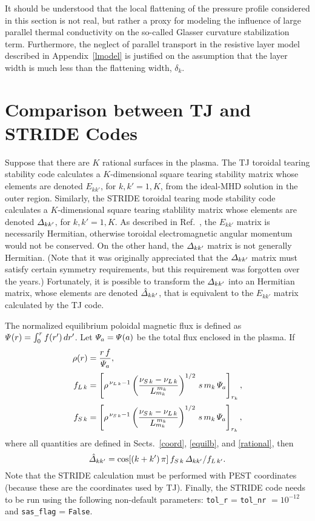 \documentclass[12pt,prb,aps]{revtex4-1}
\begin{document}
It should be understood that the local flattening of the pressure profile considered in this section is not real, but rather a proxy for modeling the influence of large parallel thermal conductivity on the so-called 
Glasser curvature stabilization term.\cite{ggj,ggj1,con1} Furthermore,  the neglect of parallel transport in the resistive layer model
described in Appendix~\ref{lmodel} is justified on the assumption that the layer width is much less than the flattening width, $\delta_{k}$. 

\section{Comparison between TJ and STRIDE Codes}\label{comp}
Suppose that there are $K$ rational surfaces in the plasma. 
The TJ toroidal tearing stability code calculates a $K$-dimensional square tearing stability matrix whose elements are denoted $E_{kk'}$, for $k,k'=1,K$, from the
ideal-MHD solution in the outer region.\cite{tj} Similarly, the STRIDE toroidal tearing mode stability code calculates a $K$-dimensional square tearing stablility
matrix whose elements are denoted ${\mit\Delta}_{kk'}$, for $k,k'=1,K$.\cite{aglas1} As described in Ref.~, the $E_{kk'}$ matrix is necessarily Hermitian,
otherwise toroidal electromagnetic angular momentum would not be conserved. On the other hand, the ${\mit\Delta}_{kk'}$ matrix is not generally Hermitian. 
(Note that it was originally appreciated that the ${\mit\Delta}_{kk'}$ matrix must satisfy certain symmetry requirements,\cite{pletz1} but this requirement
was forgotten over the years.) Fortunately, it is possible to transform the ${\mit\Delta}_{kk'}$ into an Hermitian matrix, whose elements are denoted $\hat{\mit\Delta}_{kk'}$, 
that is equivalent to the $E_{kk'}$ matrix calculated by the TJ code. 

The normalized  equilibrium poloidal magnetic flux is defined as ${\mit\Psi}(r)= \int_0^r f(r')\,dr'$. Let ${\mit\Psi}_a={\mit\Psi}(a)$ be the total flux enclosed in the plasma. 
If
\begin{align}
\rho(r) &= \frac{r\,f}{{\mit\Psi}_a},\\[0.5ex]
f_{L\,k}& = \left[\rho^{\,\nu_{L\,k}-1}\left(\frac{\nu_{S\,k}-\nu_{L\,k}}{L_{m_k}^{\,m_k}}\right)^{1/2}\,s\,m_k\,{\mit\Psi}_a\right]_{r_k},\\[0.5ex]
f_{S\,k}& = \left[\rho^{\,\nu_{S\,k}-1}\left(\frac{\nu_{S\,k}-\nu_{L\,k}}{L_{m_k}^{\,m_k}}\right)^{1/2}\,s\,m_k\,{\mit\Psi}_a\right]_{r_k},
\end{align}
where all quantities are defined in Sects.~\ref{coord}, \ref{equilb}, and \ref{rational}, then
\begin{equation}
\hat{\mit\Delta}_{kk'} = \cos[(k+k')\,\pi]\,f_{S\,k}\,{\mit\Delta}_{kk'}/f_{L\,k'}.
\end{equation}
Note that the STRIDE calculation must be performed with PEST coordinates (because these are the coordinates used by TJ). Finally, the
STRIDE code needs to be run using the following non-default parameters: \verb|tol_r| = \verb|tol_nr| $=10^{-12}$ and \verb|sas_flag| = \verb|False|. 
\end{document}
